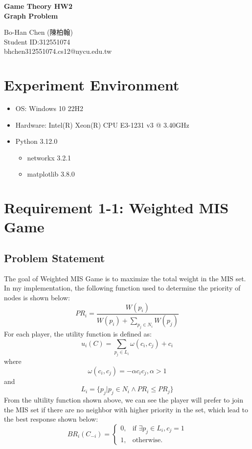 \documentclass[a4paper, oneside, final, 12pt]{scrartcl} %
\begin{document}


\begin{center}
    {\fontsize{18}{30}\textbf{Game Theory HW2 \\ Graph Problem}}
\end{center}

\begin{center}
  Bo-Han Chen (陳柏翰) \\
  Student ID:312551074 \\
  bhchen312551074.cs12@nycu.edu.tw
\end{center}

\section{Experiment Environment}

\begingroup
\raggedright

\begin{itemize}
  \item OS: Windows 10 22H2
  \item Hardware: Intel(R) Xeon(R) CPU E3-1231 v3 @ 3.40GHz
  \item Python 3.12.0
  \begin{itemize}
    \item networkx 3.2.1
    \item matplotlib 3.8.0
  \end{itemize}
\end{itemize}

\section{Requirement 1-1: Weighted MIS Game}

\subsection{Problem Statement}

The goal of Weighted MIS Game is to maximize the total weight in the MIS set.
In my implementation, the following function used to 
determine the priority of nodes is shown below:
$$PR_i = \frac{W(p_i)}{W(p_i) + \sum_{p_j \in N_i}{W(p_j)}}$$
For each player, the utility function is defined as:
$$u_i(C) = \sum_{p_j \in L_i} \omega(c_i, c_j) + c_i$$
where
$$\omega(c_i, c_j) = -\alpha c_i c_j, \alpha > 1$$
and
$$L_i = \{ p_j|p_j \in N_i \wedge PR_i \le PR_j \}$$
From the ultility function shown above, we can see the player will prefer to
join the MIS set if there are no neighbor with higher priority in the set, 
which lead to the best response shown below:
$$BR_i(C_{-i}) = 
\begin{cases}
  0, & \text{if } \exists p_j \in L_i, c_j = 1 \\
  1, & \text{otherwise.}
\end{cases}$$
\end{document}
